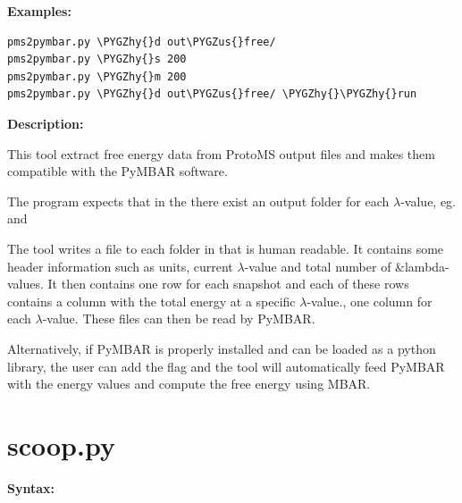 \documentclass[letterpaper,10pt,english]{sphinxmanual}
\def\PYGZus{\char`\_}
\def\PYGZhy{\char`\-}
\begin{document}
\textbf{Examples:}

\begin{Verbatim}[commandchars=\\\{\}]
pms2pymbar.py \PYGZhy{}d out\PYGZus{}free/
pms2pymbar.py \PYGZhy{}s 200
pms2pymbar.py \PYGZhy{}m 200
pms2pymbar.py \PYGZhy{}d out\PYGZus{}free/ \PYGZhy{}\PYGZhy{}run
\end{Verbatim}

\textbf{Description:}

This tool extract free energy data from ProtoMS output files and makes them compatible with the PyMBAR software.

The program expects that in the  there exist an output folder for each \(\lambda\)-value, eg.  and 

The tool writes a file  to each folder in  that is human readable. It contains some header information such as units, current \(\lambda\)-value and total number of \&lambda-values. It then contains one row for each snapshot and each of these rows contains a column with the total energy at a specific \(\lambda\)-value., one column for each \(\lambda\)-value. These files can then be read by PyMBAR.

Alternatively, if PyMBAR is properly installed and can be loaded as a python library, the user can add the  flag and the tool will automatically feed PyMBAR with the energy values and compute the free energy using MBAR.


\section{scoop.py}
\label{tools:scoop-py}
\textbf{Syntax:}
\end{document}
